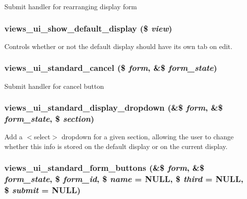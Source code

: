 \label{admin_8inc_aae24eefaa1669ab2602066dbb0dc088f}
Submit handler for rearranging display form \hypertarget{admin_8inc_a12ff546b37d157b29b5aa22318fdfdaf}{
\subsubsection[{views\_\-ui\_\-show\_\-default\_\-display}]{\setlength{\rightskip}{0pt plus 5cm}views\_\-ui\_\-show\_\-default\_\-display (\$ {\em view})}}
\label{admin_8inc_a12ff546b37d157b29b5aa22318fdfdaf}
Controls whether or not the default display should have its own tab on edit. \hypertarget{admin_8inc_a69c20e73b4a54447f15797c44bdb8344}{
\subsubsection[{views\_\-ui\_\-standard\_\-cancel}]{\setlength{\rightskip}{0pt plus 5cm}views\_\-ui\_\-standard\_\-cancel (\$ {\em form}, \/  \&\$ {\em form\_\-state})}}
\label{admin_8inc_a69c20e73b4a54447f15797c44bdb8344}
Submit handler for cancel button \hypertarget{admin_8inc_a097b738809afa14fdc78f40dff3fd3b0}{
\subsubsection[{views\_\-ui\_\-standard\_\-display\_\-dropdown}]{\setlength{\rightskip}{0pt plus 5cm}views\_\-ui\_\-standard\_\-display\_\-dropdown (\&\$ {\em form}, \/  \&\$ {\em form\_\-state}, \/  \$ {\em section})}}
\label{admin_8inc_a097b738809afa14fdc78f40dff3fd3b0}
Add a $<$select$>$ dropdown for a given section, allowing the user to change whether this info is stored on the default display or on the current display. \hypertarget{admin_8inc_a14c82c16cedbaecf8fb20e1aabc1a15b}{
\subsubsection[{views\_\-ui\_\-standard\_\-form\_\-buttons}]{\setlength{\rightskip}{0pt plus 5cm}views\_\-ui\_\-standard\_\-form\_\-buttons (\&\$ {\em form}, \/  \&\$ {\em form\_\-state}, \/  \$ {\em form\_\-id}, \/  \$ {\em name} = {\ttfamily NULL}, \/  \$ {\em third} = {\ttfamily NULL}, \/  \$ {\em submit} = {\ttfamily NULL})}}
